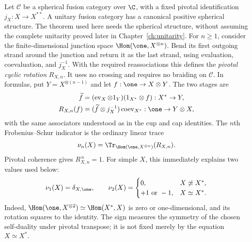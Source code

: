 Let $\mathcal C$ be a spherical fusion category over $\C$, with a
fixed pivotal identification $j_X:X\to X^{**}$. A unitary fusion
category has a canonical positive spherical structure. The theorem
used here needs the spherical structure, without assuming the
complete unitarity proved later in Chapter~\ref{ch:unitarity}.
For $n\ge1$, consider the finite-dimensional junction space
$\Hom(\one,X^{\otimes n})$. Bend its first outgoing strand around
the junction and return it as the last strand, using evaluation,
coevaluation, and $j_X^{-1}$. With the required reassociations this
defines the \emph{pivotal cyclic rotation} $R_{X,n}$.
It uses no crossing and requires no braiding on $\mathcal C$.
In formulas, put $Y=X^{\otimes(n-1)}$ and let
$f:\one\to X\otimes Y$. The two stages are
\begin{align*}
 \widetilde f&=(\operatorname{ev}_X\otimes1_Y)
                    (1_{X^*}\otimes f):X^*\to Y,
 \\
 R_{X,n}(f)&=(\widetilde f\otimes j_X^{-1})
                    \operatorname{coev}_{X^*}:\one\to Y\otimes X,
\end{align*}
with the same associators understood as in the cup and cap identities.
The $n$th Frobenius--Schur indicator is the ordinary linear trace
\begin{equation}\label{eq:c-indicator-definition}
 \nu_n(X)=\Tr_{\Hom(\one,X^{\otimes n})}(R_{X,n}).
\end{equation}
Pivotal coherence gives $R_{X,n}^{\,n}=1$. For simple $X$, this
immediately explains two values used below:
\[
 \nu_1(X)=\delta_{X,\one},\qquad
 \nu_2(X)=
 \begin{cases}
 0,&X\not\simeq X^*,\\
 +1\text{ or }-1,&X\simeq X^*.
 \end{cases}
\]
Indeed, $\Hom(\one,X^{\otimes2})\simeq\Hom(X^*,X)$ is zero or
one-dimensional, and its rotation squares to the identity. The sign
measures the symmetry of the chosen self-duality under pivotal
transpose; it is not fixed merely by the equation $X\simeq X^*$.

